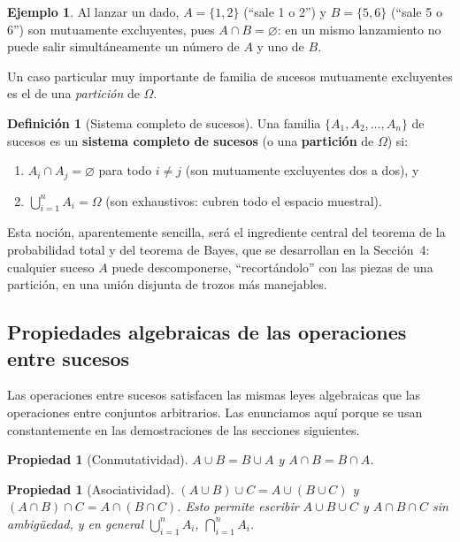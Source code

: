 \documentclass[11pt,a4paper]{article}
\theoremstyle{plain}
\newtheorem{propiedad}[teorema]{Propiedad}
\theoremstyle{definition}
\newtheorem{definicion}[teorema]{Definición}
\newtheorem{ejemplo}[teorema]{Ejemplo}
\theoremstyle{remark}
\begin{document}
\begin{ejemplo}
Al lanzar un dado, $A=\{1,2\}$ (``sale 1 o 2'') y $B=\{5,6\}$ (``sale 5 o 6'') son mutuamente excluyentes, pues $A \cap B = \varnothing$: en un mismo lanzamiento no puede salir simultáneamente un número de $A$ y uno de $B$.
\end{ejemplo}

Un caso particular muy importante de familia de sucesos mutuamente excluyentes es el de una \emph{partición} de $\Omega$.

\begin{definicion}[Sistema completo de sucesos]
Una familia $\{A_1,A_2,\dots,A_n\}$ de sucesos es un \textbf{sistema completo de sucesos} (o una \textbf{partición} de $\Omega$) si:
\begin{enumerate}
\item $A_i \cap A_j = \varnothing$ para todo $i \neq j$ (son mutuamente excluyentes dos a dos), y
\item $\displaystyle\bigcup_{i=1}^{n} A_i = \Omega$ (son exhaustivos: cubren todo el espacio muestral).
\end{enumerate}
\end{definicion}

Esta noción, aparentemente sencilla, será el ingrediente central del teorema de la probabilidad total y del teorema de Bayes, que se desarrollan en la Sección~4: cualquier suceso $A$ puede descomponerse, ``recortándolo'' con las piezas de una partición, en una unión disjunta de trozos más manejables.

\subsection{Propiedades algebraicas de las operaciones entre sucesos}

Las operaciones entre sucesos satisfacen las mismas leyes algebraicas que las operaciones entre conjuntos arbitrarios. Las enunciamos aquí porque se usan constantemente en las demostraciones de las secciones siguientes.

\begin{propiedad}[Conmutatividad]
$A\cup B = B\cup A$ y $A\cap B = B\cap A$.
\end{propiedad}

\begin{propiedad}[Asociatividad]
$(A\cup B)\cup C = A\cup(B\cup C)$ y $(A\cap B)\cap C = A\cap(B\cap C)$. Esto permite escribir $A\cup B\cup C$ y $A\cap B\cap C$ sin ambigüedad, y en general $\bigcup_{i=1}^n A_i$, $\bigcap_{i=1}^n A_i$.
\end{propiedad}
\end{document}
